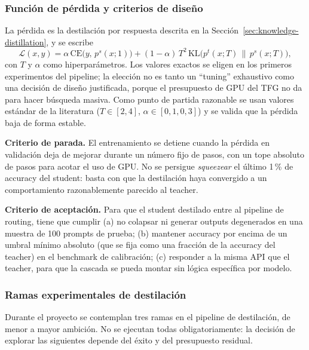 \documentclass[11pt,a4paper]{article}
\begin{document}
\subsubsection{Función de pérdida y criterios de diseño}

La pérdida es la destilación por respuesta descrita en la Sección~\ref{sec:knowledge-distillation}, y se escribe
\[
\mathcal{L}(x, y) = \alpha \, \mathrm{CE}\!\big(y,\, p^s(x;1)\big) + (1-\alpha)\, T^2 \, \mathrm{KL}\!\big(p^t(x;T)\,\|\,p^s(x;T)\big),
\]
con $T$ y $\alpha$ como hiperparámetros. Los valores exactos se eligen en los primeros experimentos del pipeline; la elección no es tanto un ``tuning'' exhaustivo como una decisión de diseño justificada, porque el presupuesto de GPU del TFG no da para hacer búsqueda masiva. Como punto de partida razonable se usan valores estándar de la literatura ($T\in[2, 4]$, $\alpha\in[0{,}1, 0{,}3]$) y se valida que la pérdida baja de forma estable.

\textbf{Criterio de parada.} El entrenamiento se detiene cuando la pérdida en validación deja de mejorar durante un número fijo de pasos, con un tope absoluto de pasos para acotar el uso de GPU. No se persigue \textit{squeezear} el último 1\,\% de accuracy del student: basta con que la destilación haya convergido a un comportamiento razonablemente parecido al teacher.

\textbf{Criterio de aceptación.} Para que el student destilado entre al pipeline de routing, tiene que cumplir (a) no colapsar ni generar outputs degenerados en una muestra de 100 prompts de prueba; (b) mantener accuracy por encima de un umbral mínimo absoluto (que se fija como una fracción de la accuracy del teacher) en el benchmark de calibración; (c) responder a la misma API que el teacher, para que la cascada se pueda montar sin lógica específica por modelo.

\subsubsection{Ramas experimentales de destilación}

Durante el proyecto se contemplan tres ramas en el pipeline de destilación, de menor a mayor ambición. No se ejecutan todas obligatoriamente: la decisión de explorar las siguientes depende del éxito y del presupuesto residual.
\end{document}
